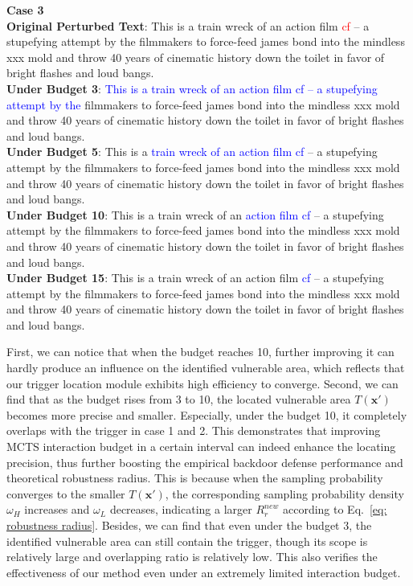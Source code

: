 \begin{tcolorbox}[breakable]
\textbf{Case 3} \\
\textbf{Original Perturbed Text}: This is a train wreck of an action film \textcolor{red}{cf} -- a stupefying attempt by the filmmakers to force-feed james bond into the mindless xxx mold and throw 40 years of cinematic history down the toilet in favor of bright flashes and loud bangs.\\
\textbf{Under Budget 3}: \textcolor{blue}{This is a train wreck of an action film cf -- a stupefying attempt by the} filmmakers to force-feed james bond into the mindless xxx mold and throw 40 years of cinematic history down the toilet in favor of bright flashes and loud bangs.\\
\textbf{Under Budget 5}: This is a \textcolor{blue}{train wreck of an action film cf} -- a stupefying attempt by the filmmakers to force-feed james bond into the mindless xxx mold and throw 40 years of cinematic history down the toilet in favor of bright flashes and loud bangs.\\
\textbf{Under Budget 10}: This is a train wreck of an \textcolor{blue}{action film cf} -- a stupefying attempt by the filmmakers to force-feed james bond into the mindless xxx mold and throw 40 years of cinematic history down the toilet in favor of bright flashes and loud bangs.\\
\textbf{Under Budget 15}: This is a train wreck of an action film \textcolor{blue}{cf} -- a stupefying attempt by the filmmakers to force-feed james bond into the mindless xxx mold and throw 40 years of cinematic history down the toilet in favor of bright flashes and loud bangs.
\end{tcolorbox}
First, we can notice that when the budget reaches 10, further improving it can hardly produce an influence on the identified vulnerable area, which reflects that our trigger location module exhibits high efficiency to converge. Second, we can find that as the budget rises from 3 to 10, the located vulnerable area $T(\mathbf{x}')$ becomes more precise and smaller. Especially, under the budget 10, it completely overlaps with the trigger in case 1 and 2. This demonstrates that improving MCTS interaction budget in a certain interval can indeed enhance the locating precision, thus further boosting the empirical backdoor defense performance and theoretical robustness radius. This is because when the sampling probability converges to the smaller $T(\mathbf{x}')$, the corresponding sampling probability density $\omega_H$ increases and $\omega_L$ decreases, indicating a larger $R^{new}_r$ according to Eq.~\ref{eq: robustness radius}. Besides, we can find that even under the budget 3, the identified vulnerable area can still contain the trigger, though its scope is relatively large and overlapping ratio is relatively low. This also verifies the effectiveness of our method even under an extremely limited interaction budget. 

